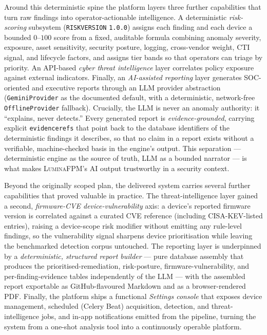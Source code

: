 \documentclass[12pt,a4paper]{report}
\renewcommand{\_}{\textunderscore\allowbreak}
\begin{document}
Around this deterministic spine the platform layers three further capabilities that turn raw findings into operator-actionable intelligence. A deterministic \emph{risk-scoring} subsystem (\texttt{RISK\_VERSION} \texttt{1.0.0}) assigns each finding and each device a bounded $0$--$100$ score from a fixed, auditable formula combining anomaly severity, exposure, asset sensitivity, security posture, logging, cross-vendor weight, CTI signal, and lifecycle factors, and assigns tier bands so that operators can triage by priority. An API-based \emph{cyber threat intelligence} layer correlates policy exposure against external indicators. Finally, an \emph{AI-assisted reporting} layer generates SOC-oriented and executive reports through an LLM provider abstraction (\texttt{GeminiProvider} as the documented default, with a deterministic, network-free \texttt{OfflineProvider} fallback). Crucially, the LLM is never an anomaly authority: it ``explains, never detects.'' Every generated report is \emph{evidence-grounded}, carrying explicit \texttt{evidence\_refs} that point back to the database identifiers of the deterministic findings it describes, so that no claim in a report exists without a verifiable, machine-checked basis in the engine's output. This separation --- deterministic engine as the source of truth, LLM as a bounded narrator --- is what makes \textsc{LuminaFPM}'s AI output trustworthy in a security context.

Beyond the originally scoped plan, the delivered system carries several further capabilities that proved valuable in practice. The threat-intelligence layer gained a second, \emph{firmware-CVE device-vulnerability} axis: a device's reported firmware version is correlated against a curated CVE reference (including CISA-KEV-listed entries), raising a device-scope risk modifier without emitting any rule-level findings, so the vulnerability signal sharpens device prioritisation while leaving the benchmarked detection corpus untouched. The reporting layer is underpinned by a \emph{deterministic, structured report builder} --- pure database assembly that produces the prioritised-remediation, risk-posture, firmware-vulnerability, and per-finding-evidence tables independently of the LLM --- with the assembled report exportable as GitHub-flavoured Markdown and as a browser-rendered PDF. Finally, the platform ships a functional \emph{Settings console} that exposes device management, scheduled (Celery Beat) acquisition, detection, and threat-intelligence jobs, and in-app notifications emitted from the pipeline, turning the system from a one-shot analysis tool into a continuously operable platform.
\end{document}
